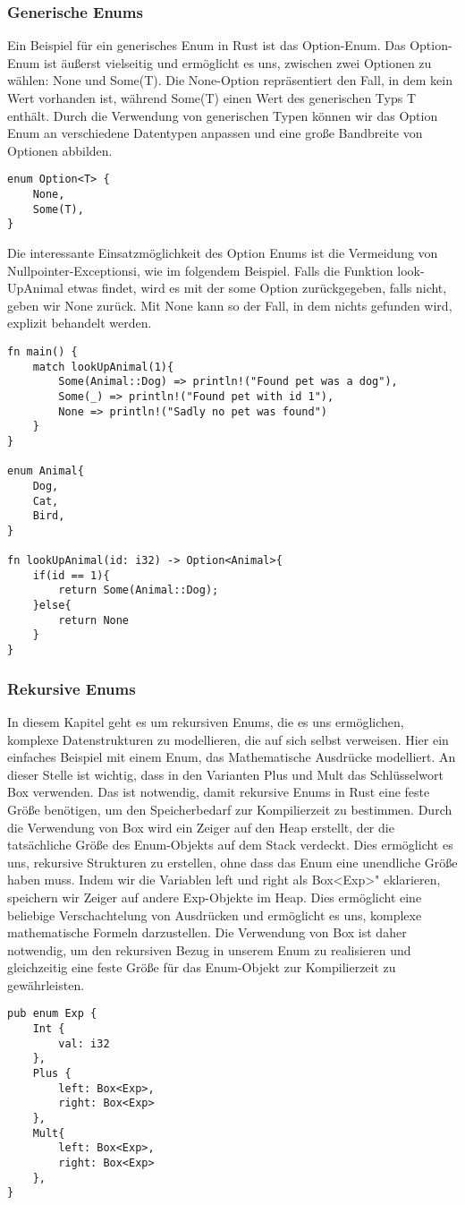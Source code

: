 \documentclass[a4paper, 1ppt]{article}
\begin{document}
\subsubsection{Generische Enums}
Ein Beispiel für ein generisches Enum in Rust ist das Option-Enum.
Das Option-Enum ist äußerst vielseitig und ermöglicht es uns, zwischen zwei Optionen zu wählen: None und Some(T). Die None-Option repräsentiert den Fall, in dem kein Wert vorhanden ist, während Some(T) einen Wert des generischen Typs T enthält. Durch die Verwendung von generischen Typen können wir das Option Enum an verschiedene Datentypen anpassen und eine große Bandbreite von Optionen abbilden.
\begin{verbatim}
enum Option<T> {
	None,
	Some(T),
}
\end{verbatim}
Die interessante Einsatzmöglichkeit des Option Enums ist die Vermeidung von Nullpointer-Exceptionsi, wie im folgendem Beispiel.
Falls die Funktion look-UpAnimal etwas findet, wird es mit der some Option zurückgegeben, falls nicht, geben wir None zurück. Mit None kann so der Fall, in dem nichts gefunden wird, explizit behandelt werden.
\begin{verbatim}
fn main() {
    match lookUpAnimal(1){
        Some(Animal::Dog) => println!("Found pet was a dog"),
        Some(_) => println!("Found pet with id 1"),
        None => println!("Sadly no pet was found")
    }
}

enum Animal{
    Dog,
    Cat,
    Bird,
}

fn lookUpAnimal(id: i32) -> Option<Animal>{
    if(id == 1){
        return Some(Animal::Dog);
    }else{
        return None
    }
}
\end{verbatim}
\subsubsection{Rekursive Enums}
In diesem Kapitel geht es um rekursiven Enums, die es uns ermöglichen, komplexe Datenstrukturen zu modellieren, die auf sich selbst verweisen. 
Hier ein einfaches Beispiel mit einem Enum, das Mathematische Ausdrücke modelliert.
An dieser Stelle ist wichtig, dass in den Varianten Plus und Mult das Schlüsselwort Box verwenden. Das ist notwendig, damit rekursive Enums in Rust eine feste Größe benötigen, um den Speicherbedarf zur Kompilierzeit zu bestimmen. Durch die Verwendung von Box wird ein Zeiger auf den Heap erstellt, der die tatsächliche Größe des Enum-Objekts auf dem Stack verdeckt. Dies ermöglicht es uns, rekursive Strukturen zu erstellen, ohne dass das Enum eine unendliche Größe haben muss.
Indem wir die Variablen left und right als Box<Exp>" eklarieren, speichern wir Zeiger auf andere Exp-Objekte im Heap. Dies ermöglicht eine beliebige Verschachtelung von Ausdrücken und ermöglicht es uns, komplexe mathematische Formeln darzustellen.
Die Verwendung von Box ist daher notwendig, um den rekursiven Bezug in unserem Enum zu realisieren und gleichzeitig eine feste Größe für das Enum-Objekt zur Kompilierzeit zu gewährleisten. 
\newpage
\begin{verbatim}
pub enum Exp {
    Int {
        val: i32
    },
    Plus {
        left: Box<Exp>,
        right: Box<Exp>
    },
    Mult{
        left: Box<Exp>,
        right: Box<Exp>
    },
}
\end{verbatim}
\end{document}
